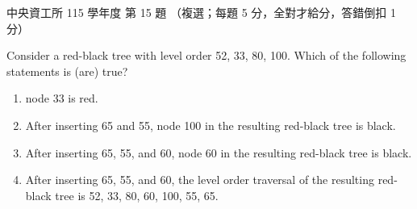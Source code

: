 \begin{pastexam}[label={px:ncu-115-dsa-15}]{中央資工所 115 學年度 第 15 題}
（複選；每題 5 分，全對才給分，答錯倒扣 1 分）

Consider a red-black tree with level order 52, 33, 80, 100. Which of the following
statements is (are) true?
\begin{enumerate}[label=\Alph*.]
\item node 33 is red.
\item After inserting 65 and 55, node 100 in the resulting red-black tree is black.
\item After inserting 65, 55, and 60, node 60 in the resulting red-black tree is black.
\item After inserting 65, 55, and 60, the level order traversal of the resulting red-black
tree is 52, 33, 80, 60, 100, 55, 65.
\end{enumerate}
\end{pastexam}

